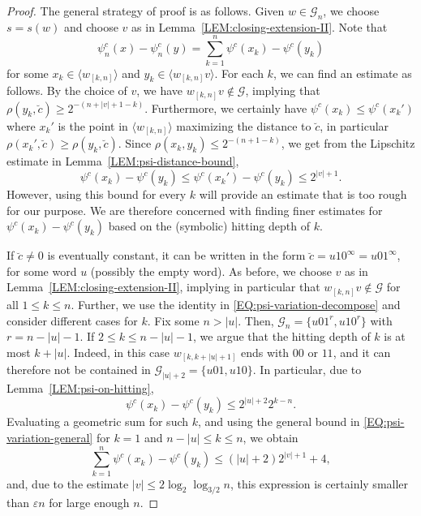 \documentclass[10pt,a4paper]{amsart}
\newcommand{\mc}{\mathcal}
\begin{document}
\begin{proof}
The general strategy of proof is as follows. Given $w \in \mc G_n$, we choose $s = s(w)$ and choose $v$ as in Lemma~\ref{LEM:closing-extension-II}.
Note that
\begin{equation}
\label{EQ:psi-variation-decompose}
\psi^c_n(x) - \psi^c_n(y) = \sum_{k=1}^n \psi^c(x_k) - \psi^c(y_k)
\end{equation}
for some $x_k \in \langle w_{[k,n]} \rangle$ and $y_k \in \langle w_{[k,n]} v \rangle$. For each $k$, we can find an estimate as follows. By the choice of $v$, we have $w_{[k,n]}v \notin \mc G$, implying that $\rho(y_k,\breve{c}) \geqslant 2^{-(n + |v| + 1 - k)}$. Furthermore, we certainly have $\psi^c(x_k) \leqslant \psi^c(x_k')$ where $x_k'$ is the point in $\langle w_{[k,n]} \rangle$ maximizing the distance to $\breve{c}$, in particular $\rho(x_k', \breve{c}) \geqslant \rho(y_k,\breve{c})$. Since $\rho(x_k,y_k) \leqslant 2^{-(n+1-k)}$, we get from the Lipschitz estimate in Lemma~\ref{LEM:psi-distance-bound},
\begin{equation}
\label{EQ:psi-variation-general}
\psi^c(x_k) - \psi^c(y_k)
\leqslant \psi^c(x_k') - \psi^c(y_k)
\leqslant 2^{|v|+1}.
\end{equation} 
However, using this bound for every $k$ will provide an estimate that is too rough for our purpose.
We are therefore concerned with finding finer estimates for $\psi^c(x_k) - \psi^c(y_k)$ based on the (symbolic) hitting depth of $k$.


If $\breve{c} \neq 0$ is eventually constant, it can be written in the form $\breve{c} = u10^\infty = u01^\infty$, for some word $u$ (possibly the empty word). As before, we choose $v$ as in Lemma~\ref{LEM:closing-extension-II}, implying in particular that $w_{[k,n]}v \notin \mc G$ for all $1\leqslant k \leqslant n$. Further, we use the identity in \eqref{EQ:psi-variation-decompose} and consider different cases for $k$. Fix some $n > |u|$. Then, $\mc G_n = \{ u01^r, u10^r \}$  with $r = n-|u|-1$. If $2 \leqslant k \leqslant n - |u| - 1$, we argue that the hitting depth of $k$ is at most $k+|u|$. Indeed, in this case $w_{[k,k+|u| + 1]}$ ends with $00$ or $11$, and it can therefore not be contained in $\mc G_{|u| + 2} = \{ u01, u10\}$. 
In particular, due to Lemma~\ref{LEM:psi-on-hitting},
\[
\psi^c(x_k) - \psi^c(y_k) \leqslant 2^{|u| + 2} 2^{k-n}.
\]
Evaluating a geometric sum for such $k$, and using the general bound in \eqref{EQ:psi-variation-general} for $k=1$ and $n-|u| \leqslant k \leqslant n$, we obtain
\[
\sum_{k=1}^n \psi^c(x_k) - \psi^c(y_k)
\leqslant (|u| + 2) 2^{|v| + 1} + 4,
\]
and, due to the estimate $|v| \leqslant 2 \log_2 \log_{3/2} n$, this expression is certainly smaller than $\varepsilon n$ for large enough $n$.


\end{proof}
\end{document}
